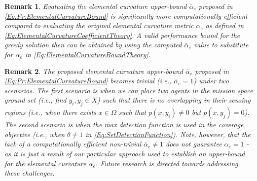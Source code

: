 \documentclass[letterpaper, 10 pt, conference]{ieeeconf}
\newtheorem{remark}{Remark}
\begin{document}

\begin{remark}
Evaluating the elemental curvature upper-bound $\bar{\alpha}_e$ proposed in \eqref{Eq:Pr:ElementalCurvatureBound} is significantly more computationally efficient compared to evaluating the original elemental curvature metric $\alpha_e$ as defined in \eqref{Eq:ElementalCurvatureCoefficientTheory}. 
A valid performance bound for the greedy solution then can be obtained by using the computed $\bar{\alpha}_e$ value to substitute for $\alpha_e$ in \eqref{Eq:ElementalCurvatureBoundTheory}. 
\end{remark}

\begin{remark}\label{Rm:ElementalCurvatureBoundTriviality}
The proposed elemental curvature upper-bound $\bar{\alpha}_e$ proposed in \eqref{Eq:Pr:ElementalCurvatureBound} becomes trivial (i.e., $\bar{\alpha}_e=1$) under two scenarios. The first scenario is when we can place two agents in the mission space ground set (i.e., find $y_i,y_j\in X$) such that there is no overlapping in their sensing regions (i.e., when there exists $x\in \Omega$ such that $p(x,y_i)\neq 0$ but $p(x,y_j)=0$). The second scenario is when the max detection function is used in the coverage objective (i.e., when $\theta \neq 1$ in \eqref{Eq:SetDetectionFunction}). Note, however, that the lack of a computationally efficient non-trivial $\bar{\alpha}_e \neq 1$ does not guarantee $\alpha_e = 1$ - as it is just a result of our particular approach used to establish an upper-bound for the elemental curvature $\alpha_e$. Future research is directed towards addressing these challenges.
\end{remark}
\end{document}
